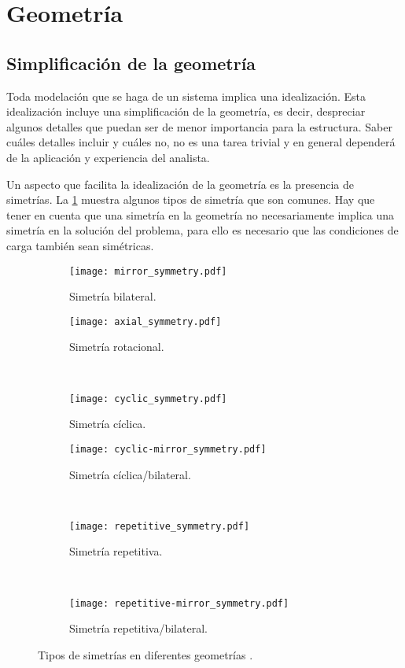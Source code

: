 \section{Geometría}

\subsection{Simplificación de la geometría}
Toda modelación que se haga de un sistema implica una idealización. Esta idealización incluye una simplificación de la geometría, es decir, despreciar algunos detalles que puedan ser de menor importancia para la estructura. Saber cuáles detalles incluir y cuáles no, no es una tarea trivial y en general dependerá de la aplicación y experiencia del analista.

Un aspecto que facilita la idealización de la geometría es la presencia de simetrías. La \cref{fig:simetrias} muestra algunos tipos de simetría que son comunes. Hay que tener en cuenta que una simetría en la geometría no necesariamente implica una simetría en la solución del problema, para ello es necesario que las condiciones de carga también sean simétricas.
\begin{figure}[H]
    \centering
    \begin{subfigure}[b]{0.49\textwidth}
    \centering
	\texttt{[image: mirror\_symmetry.pdf]}
	\caption{Simetría bilateral.}
	\end{subfigure}
    \begin{subfigure}[b]{0.49\textwidth}
    \centering
	\texttt{[image: axial\_symmetry.pdf]}
	\caption{Simetría rotacional.}
	\end{subfigure}\\	
	\begin{subfigure}[b]{0.49\textwidth}
	\centering
	\texttt{[image: cyclic\_symmetry.pdf]}
	\caption{Simetría cíclica.}
	\end{subfigure}
    \begin{subfigure}[b]{0.49\textwidth}
    \centering
	\texttt{[image: cyclic-mirror\_symmetry.pdf]}
	\caption{Simetría cíclica/bilateral.}
	\end{subfigure}\\
    \begin{subfigure}[b]{\textwidth}
    \centering
	\texttt{[image: repetitive\_symmetry.pdf]}
	\caption{Simetría repetitiva.}
	\end{subfigure}\\
    \begin{subfigure}[b]{\textwidth}
    \centering
	\texttt{[image: repetitive-mirror\_symmetry.pdf]}
	\caption{Simetría repetitiva/bilateral.}
	\end{subfigure}
    \caption{Tipos de simetrías en diferentes geometrías \cite{how_to_FEM}.}
    \label{fig:simetrias}
\end{figure}


